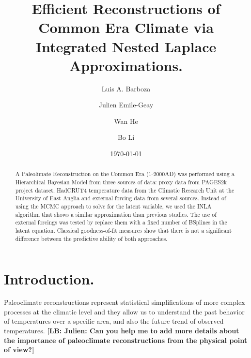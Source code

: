 \documentclass[11pt]{amsart}
\theoremstyle{plain}
\theoremstyle{definition}
\theoremstyle{remark}
\newcommand{\lb}[1]{\color{MidnightBlue}\textbf{[LB: #1]}\normalcolor}
\begin{document}
\title[Paleoclimate Reconstruction using INLA.]{Efficient Reconstructions of Common Era Climate via Integrated Nested Laplace Approximations.}

\author{Luis A. Barboza}
\address{Centro de Investigacion en Matematica Pura y Aplicada (CIMPA)-Escuela
  de Matematica, Universidad de Costa Rica\\
San Jos\'e, Costa Rica}


\author{Julien Emile-Geay}
\address{Department of Earth Sciences \\
  University of Southern California \\
  Los Angeles, California, USA.
}

\author{Wan He}

\author{Bo Li}
\address{Department of Statistics \\
  University of Illinois at Urbana-Champaign \\
  Champaign, Illinois, USA.
}



\date{\today}
\subjclass[2010]{}
\maketitle

\begin{abstract}
A Paleolimate Reconstruction on the Common Era (1-2000AD) was performed using a
Hierarchical Bayesian Model from three sources of data: proxy data from PAGES2k
project dataset, HadCRUT4 temperature data from the Climatic Research Unit
at the University of East Anglia and external forcing data from several sources.
Instead of using the MCMC approach to solve for the latent variable, we used the
INLA algorithm that shows a similar approximation than previous studies. The use
of external forcings was tested by replace them with a fixed number of
BSplines in the latent equation. Classical goodness-of-fit measures show that there is not a significant
difference between the predictive ability of both approaches. 
\end{abstract}

\section{Introduction.}
\label{sec:intro}
 
Paleoclimate reconstructions represent statistical simplifications of more
complex processes at the climatic level and they allow us to understand the past
behavior of temperatures over a specific area, and also the future trend of
observed temperatures. \lb{Julien: Can you help me to add more details about the
importance of paleoclimate reconstructions from the physical point of view?}
\end{document}
